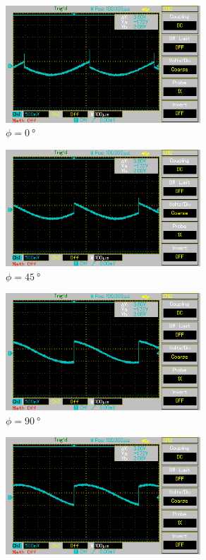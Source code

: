 \begin{figure}%
    \begin{subfigure}{0.5\textwidth}%
    \centering%
    \includegraphics[width = 7.3cm]{./Oszilloskop Bilder/png/5.3/n1.png}%
    \caption{$\phi = \qty[]{0}{\degree}$}%
    \label{fig:phase6}%
    \end{subfigure}%
    \hfill%
    \begin{subfigure}{0.5\textwidth}%
    \centering%
    \includegraphics[width = 7.3cm]{./Oszilloskop Bilder/png/5.3/n2.png}%
    \caption{$\phi = \qty[]{45}{\degree}$}%
    \label{fig:phase7}%
    \end{subfigure}%
    \hfill
    \begin{subfigure}{0.5\textwidth}%
    \centering%
    \includegraphics[width = 7.3cm]{./Oszilloskop Bilder/png/5.3/n3.png}%
    \caption{$\phi = \qty[]{90}{\degree}$}%
    \label{fig:phase8}%
    \end{subfigure}%
    \hfill%
    \begin{subfigure}{0.5\textwidth}%
    \centering%
    \includegraphics[width = 7.3cm]{./Oszilloskop Bilder/png/5.3/n4.png}%

\end{subfigure}
\end{figure}
